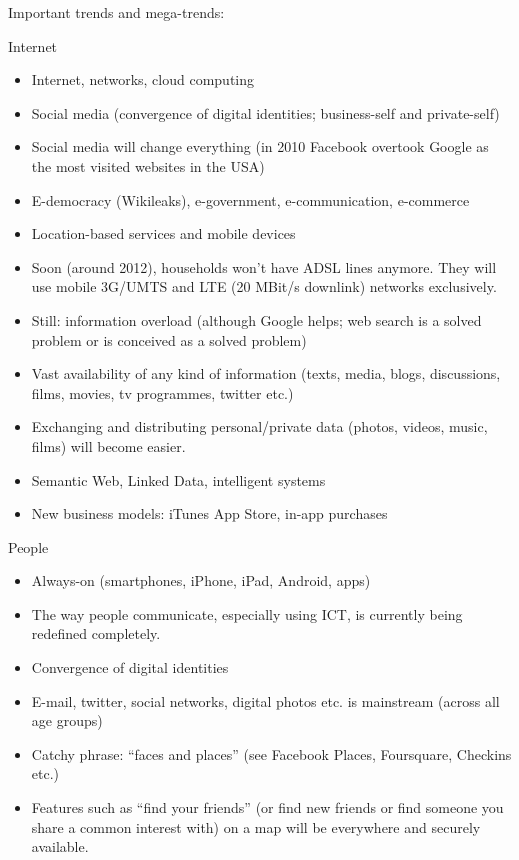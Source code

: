 \begin{multicols}{2}
Important trends and mega-trends:

Internet

\begin{itemize}
\item Internet, networks, cloud computing
\item Social media (convergence of digital identities; business-self and private-self)
\item Social media will change everything (in 2010 Facebook overtook Google as the most visited websites in the USA)
\item E-democracy (Wikileaks), e-government, e-communication, e-commerce
\item Location-based services and mobile devices
\item Soon (around 2012), households won’t have ADSL lines anymore. They will use mobile 3G/UMTS and LTE (20 MBit/s downlink) networks exclusively.
\item Still: information overload (although Google helps; web search is a solved problem or is conceived as a solved problem)
\item Vast availability of any kind of information (texts, media, blogs, discussions, films, movies, tv programmes, twitter etc.)
\item Exchanging and distributing personal/private data (photos, videos, music, films) will become easier.
\item Semantic Web, Linked Data, intelligent systems
\item New business models: iTunes App Store, in-app purchases
\end{itemize}

People

\begin{itemize}
\item Always-on (smartphones, iPhone, iPad, Android, apps)
\item The way people communicate, especially using ICT, is currently being redefined completely.
\item Convergence of digital identities
\item E-mail, twitter, social networks, digital photos etc. is mainstream (across all age groups)
\item Catchy phrase: “faces and places” (see Facebook Places, Foursquare, Checkins etc.)
\item Features such as “find your friends” (or find new friends or find someone you share a common interest with) on a map will be everywhere and securely available.
\end{itemize}


\end{multicols}
